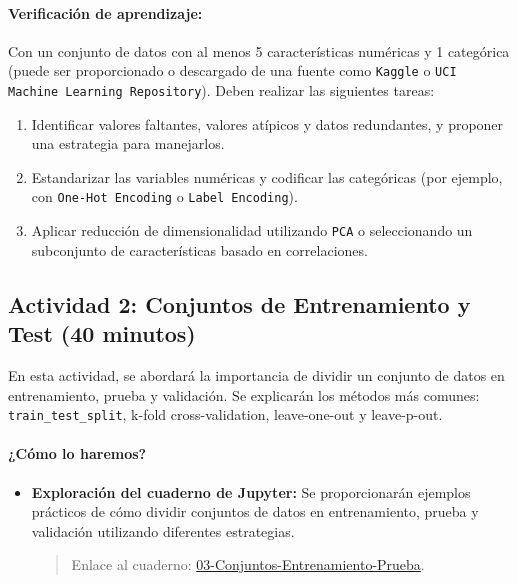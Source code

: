 \documentclass[a4,11pt]{aleph-notas}
\begin{document}
\paragraph{Verificación de aprendizaje:} Con un conjunto de datos con al menos 5 características numéricas y 1 categórica (puede ser proporcionado o descargado de una fuente como \texttt{Kaggle} o \texttt{UCI Machine Learning Repository}). Deben realizar las siguientes tareas:
\begin{enumerate}
    \item Identificar valores faltantes, valores atípicos y datos redundantes, y proponer una estrategia para manejarlos.
    \item Estandarizar las variables numéricas y codificar las categóricas (por ejemplo, con \texttt{One-Hot Encoding} o \texttt{Label Encoding}).
    \item Aplicar reducción de dimensionalidad utilizando \texttt{PCA} o seleccionando un subconjunto de características basado en correlaciones.
\end{enumerate}

\subsection*{Actividad 2: Conjuntos de Entrenamiento y Test (40 minutos)}  

En esta actividad, se abordará la importancia de dividir un conjunto de datos en entrenamiento, prueba y validación. Se explicarán los métodos más comunes: \texttt{train\_test\_split}, k-fold cross-validation, leave-one-out y leave-p-out.

\paragraph{¿Cómo lo haremos?}  
\begin{itemize}[leftmargin=*]
    \item \textbf{Exploración del cuaderno de Jupyter:}  
    Se proporcionarán ejemplos prácticos de cómo dividir conjuntos de datos en entrenamiento, prueba y validación utilizando diferentes estrategias.
    \begin{quote}
        Enlace al cuaderno: \href{https://colab.research.google.com/github/andres-merino/AprendizajeAutomaticoInicial-05-N0105/blob/main/2-Notebooks/03-Conjuntos-Entrenamiento-Prueba.ipynb}{03-Conjuntos-Entrenamiento-Prueba}.
    \end{quote}
\end{itemize}
\end{document}
